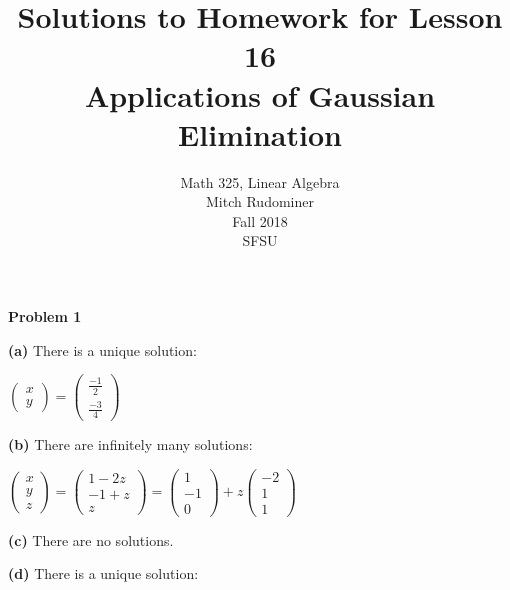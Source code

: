 \documentclass[oneside,12pt]{amsart}
\begin{document}
\title{Solutions to Homework for Lesson 16 \\ Applications of Gaussian Elimination}
\author{Math 325, Linear Algebra \\ Mitch Rudominer \\ Fall 2018 \\ SFSU }
\date{}

\maketitle


\textbf{Problem 1}

\bigskip


\textbf{(a)} There is a unique solution:

\bigskip

$
\begin{pmatrix}
x \\  y
\end{pmatrix}
=
\begin{pmatrix}
\frac{-1}{2} \\[6pt]
\frac{-3}{4}
\end{pmatrix}
$


\bigskip

\textbf{(b)} There are infinitely many solutions:

\bigskip

$
\begin{pmatrix}
x \\  y \\z
\end{pmatrix}
=
\begin{pmatrix}
1-2z \\
-1+z\\
z
\end{pmatrix}
=
\begin{pmatrix}
1\\
-1 \\
0
\end{pmatrix}
+
z
\begin{pmatrix}
-2 \\
1 \\
1
\end{pmatrix}
$

\bigskip

\textbf{(c)} There are no solutions.

\bigskip

\textbf{(d)} There is a unique solution:
\end{document}
